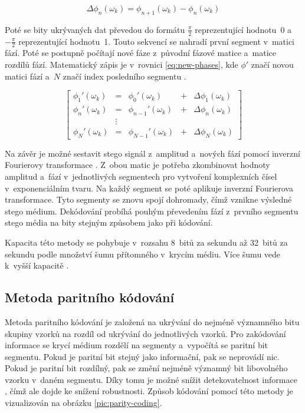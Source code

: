 \begin{equation}
    \label{eq:phase-diff}
    \Delta\phi_n(\omega_k) = \phi_{n+1}(\omega_k) - \phi_n(\omega_k)
\end{equation}

\noindent Poté se bity ukrývaných dat převedou do formátu $\frac{\pi}{2}$
reprezentující hodnotu~0 a~$-\frac{\pi}{2}$ reprezentující hodnotu~1. Touto
sekvencí se nahradí první segment v~matici fází. Poté se postupně počítají nové
fáze z~původní fázové matice a~matice rozdílů fází. Matematický zápis je
v~rovnici \ref{eq:new-phases}, kde $\phi'$ značí novou matici fází a~$N$
značí index posledního segmentu \cite{Bender1996}.

\begin{equation}
    \label{eq:new-phases}
    \left[
        \begin{array}{lclcl}
            \phi_1'(\omega_k) & = & \phi_0'(\omega_k)     & + & \Delta\phi_1(\omega_k) \\
            \phi_n'(\omega_k) & = & \phi_{n-1}'(\omega_k) & + & \Delta\phi_n(\omega_k) \\
                              & \vdots \\
            \phi_N'(\omega_k) & = & \phi_{N-1}'(\omega_k) & + & \Delta\phi_N(\omega_k)
        \end{array}
    \right]
\end{equation}

\noindent Na závěr je možné sestavit stego signál z~amplitud a~nových fází
pomocí inverzní Fourierovy transformace \cite{Bender1996}. Z~obou matic je
potřeba zkombinovat hodnoty amplitud a~fází v~jednotlivých segmentech pro
vytvoření komplexních čísel v~exponenciálním tvaru. Na každý segment se poté
aplikuje inverzní Fourierova transformace. Tyto segmenty se znovu spojí
dohromady, čímž vznikne výsledné stego médium. Dekódování probíhá pouhým
převedením fází z~prvního segmentu stego média na bity stejným způsobem jako
při kódování.

Kapacita této metody se pohybuje v~rozsahu 8~bitů za sekundu až 32~bitů za
sekundu podle množství šumu přítomného v~krycím médiu. Více šumu vede k~vyšší
kapacitě \cite{Bender1996}.

\subsection*{Metoda paritního kódování}
\label{sub:parity-coding}

Metoda paritního kódování je založená na ukrývání do nejméně významného bitu
skupiny vzorků na rozdíl od ukrývání do jednotlivých vzorků. Pro zakódování
informace se krycí médium rozdělí na segmenty a~vypočítá se paritní bit
segmentu. Pokud je paritní bit stejný jako informační, pak se neprovádí nic.
Pokud je paritní bit rozdílný, pak se změní nejméně významný bit libovolného
vzorku v~daném segmentu. Díky tomu je možné snížit detekovatelnost informace
\cite{Bandyopadhyay2008}, čímž ale dojde ke snížení robustnosti. Způsob
kódování pomocí této metody je vizualizován na obrázku \ref{pic:parity-coding}.

